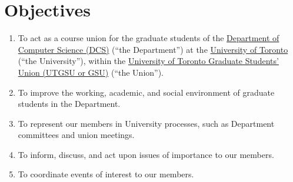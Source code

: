 \section{Objectives}

\begin{enumerate}
      \item To act as a course union for the graduate students of the
            \href{https://web.cs.toronto.edu/}{Department of Computer Science (DCS)} (“the
            Department”) at the \href{https://www.utoronto.ca/}{University of Toronto} (“the University”), within the
            \href{https://utgsu.ca/}{University of Toronto Graduate Students' Union (UTGSU
                  or GSU)} (``the Union'').
      \item To improve the working, academic, and social environment of graduate students
            in the Department.
      \item To represent our members in University processes, such as Department committees
            and union meetings.
      \item To inform, discuss, and act upon issues of importance to our members.
      \item To coordinate events of interest to our members.
\end{enumerate}